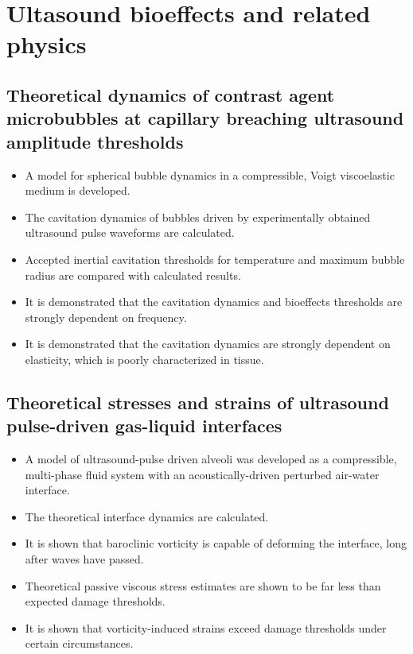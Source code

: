 \documentclass[12pt]{article}
\begin{document}
\maketitle


\section{Ultasound bioeffects and related physics}

\subsection{Theoretical dynamics of contrast agent microbubbles at capillary breaching ultrasound amplitude thresholds}
\begin{itemize}
\item A model for spherical bubble dynamics in a compressible, Voigt viscoelastic medium is developed.
\item The cavitation dynamics of bubbles driven by experimentally obtained ultrasound pulse waveforms are calculated.
\item Accepted inertial cavitation thresholds for temperature and maximum bubble radius are compared with calculated results.
\item It is demonstrated that the cavitation dynamics and bioeffects thresholds are strongly dependent on frequency.
\item It is demonstrated that the cavitation dynamics are strongly
  dependent on elasticity, which is poorly characterized in tissue.
\end{itemize}

\subsection{Theoretical stresses and strains of ultrasound pulse-driven gas-liquid interfaces}
\begin{itemize}
\item A model of ultrasound-pulse driven alveoli was developed as a compressible, multi-phase fluid system with an acoustically-driven perturbed air-water interface.
\item The theoretical interface dynamics are calculated.
\item It is shown that baroclinic vorticity is capable of deforming the interface, long after waves have passed.
\item Theoretical passive viscous stress estimates are shown to be far less than expected damage thresholds.
\item It is shown that vorticity-induced strains exceed damage thresholds under certain circumstances.
\end{itemize}
\end{document}
